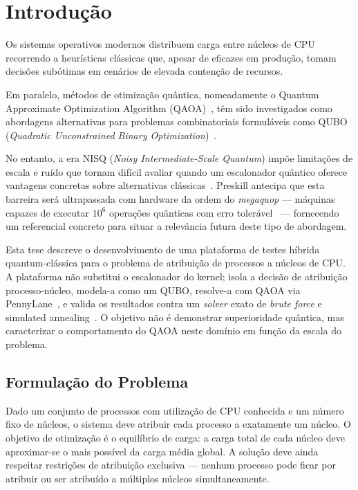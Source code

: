 \documentclass[12pt,a4paper]{article}
\begin{document}
\section{Introdução}

Os sistemas operativos modernos distribuem carga entre núcleos de CPU recorrendo a heurísticas clássicas
que, apesar de eficazes em produção, tomam decisões subótimas em cenários de elevada contenção de recursos.

Em paralelo, métodos de otimização quântica, nomeadamente o Quantum Approximate Optimization Algorithm (QAOA)~\cite{Farhi2014QAOA},
têm sido investigados como abordagens alternativas para problemas combinatoriais formuláveis
como QUBO (\textit{Quadratic Unconstrained Binary Optimization})~\cite{Kochenberger2014QUBO,Glover2019QUBO}.

No entanto, a era NISQ (\textit{Noisy Intermediate-Scale Quantum}) impõe limitações de escala e ruído que
tornam difícil avaliar quando um escalonador quântico oferece vantagens concretas sobre alternativas
clássicas~\cite{Preskill2018}. Preskill antecipa que esta barreira será ultrapassada com hardware da ordem
do \textit{megaquop} --- máquinas capazes de executar $10^6$ operações quânticas com erro
tolerável~\cite{Preskill2025} --- fornecendo um referencial concreto para situar a relevância futura
deste tipo de abordagem.

Esta tese descreve o desenvolvimento de uma plataforma de testes híbrida quantum-clássica para o problema
de atribuição de processos a núcleos de CPU. A plataforma não substitui o escalonador do kernel; isola a
decisão de atribuição processo-núcleo, modela-a como um QUBO, resolve-a com QAOA via PennyLane~\cite{Bergholm2018PennyLane}, e valida
os resultados contra um \textit{solver} exato de \textit{brute force} e simulated annealing~\cite{Kirkpatrick1983SA}. O objetivo não é demonstrar
superioridade quântica, mas caracterizar o comportamento do QAOA neste domínio em função da escala do problema.

\subsection{Formulação do Problema}

Dado um conjunto de processos com utilização de CPU conhecida e um número fixo de núcleos, o sistema deve
atribuir cada processo a exatamente um núcleo. O objetivo de otimização é o equilíbrio de carga: a carga
total de cada núcleo deve aproximar-se o mais possível da carga média global. A solução deve ainda respeitar
restrições de atribuição exclusiva --- nenhum processo pode ficar por atribuir ou ser atribuído a múltiplos
núcleos simultaneamente.
\end{document}
